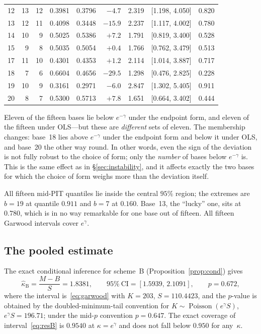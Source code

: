 \documentclass[11pt,a4paper]{article}
\theoremstyle{plain}
\theoremstyle{remark}
\newcommand{\eg}{e^{\gamma}}
\newcommand{\emg}{e^{-\gamma}}
\DeclareMathOperator{\Pois}{Poisson}
\begin{document}
\begin{table}[t]
\begin{tabular}{rrrrrrrl r}
12 & 13 & 12 & 0.3981 & 0.3796 & $-4.7$ & 2.319 & [1.198, 4.050] & 0.820\\
13 & 12 & 11 & 0.4098 & 0.3448 & $-15.9$ & 2.237 & [1.117, 4.002] & 0.780\\
14 & 10 & 9 & 0.5025 & 0.5386 & $+7.2$ & 1.791 & [0.819, 3.400] & 0.528\\
15 & 9 & 8 & 0.5035 & 0.5054 & $+0.4$ & 1.766 & [0.762, 3.479] & 0.513\\
17 & 11 & 10 & 0.4301 & 0.4353 & $+1.2$ & 2.114 & [1.014, 3.887] & 0.717\\
18 & 7 & 6 & 0.6604 & 0.4656 & $-29.5$ & 1.298 & [0.476, 2.825] & 0.228\\
19 & 10 & 9 & 0.3161 & 0.2971 & $-6.0$ & 2.847 & [1.302, 5.405] & 0.911\\
20 & 8 & 7 & 0.5300 & 0.5713 & $+7.8$ & 1.651 & [0.664, 3.402] & 0.444\\
\bottomrule
\end{tabular}
\end{table}

Eleven of the fifteen bases lie below $\emg$ under the endpoint form, and eleven
of the fifteen under OLS---but these are \emph{different} sets of eleven. The
membership changes: base~18 lies above $\emg$ under the endpoint form and below
it under OLS, and base~20 the other way round. In other words, even the sign of
the deviation is not fully robust to the choice of form; only the \emph{number}
of bases below $\emg$ is.
This is the same effect as in \S\ref{sec:instability}, and it affects exactly the
two bases for which the choice of form weighs more than the deviation itself.

All fifteen mid-PIT quantiles lie inside the central $95\%$ region; the extremes
are $b=19$ at quantile $0.911$ and $b=7$ at $0.160$. Base~13, the ``lucky'' one,
sits at $0.780$, which is in no way remarkable for one base out of fifteen. All
fifteen Garwood intervals cover $\eg$.

\subsection{The pooled estimate}\label{sec:pooled}

The exact conditional inference for scheme~B (Proposition~\ref{prop:cond})
gives
\begin{equation}\label{eq:resB}
\hat\kappa_{\mathrm B}=\frac{M-B}{S}=1.8381,\qquad
95\%\ \text{CI}=[1.5939,\,2.1091],\qquad p=0.672,
\end{equation}
where the interval is~\eqref{eq:garwood} with $K=203$, $S=110.4423$, and the
$p$-value is obtained by the doubled-minimum-tail convention for
$K\sim\Pois(\eg S)$, $\eg S=196.71$; under the mid-$p$ convention $p=0.647$.
The exact coverage of interval~\eqref{eq:resB} is $0.9540$ at $\kappa=\eg$ and
does not fall below $0.950$ for any~$\kappa$.
\end{document}
